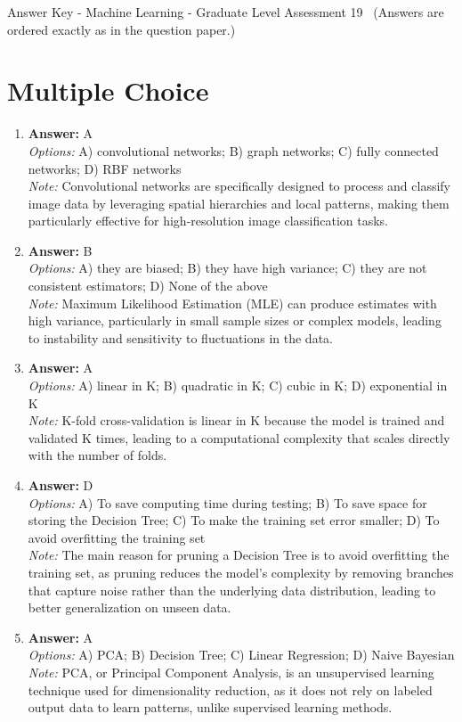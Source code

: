 \documentclass[12pt]{article}
\begin{document}
\begin{center}
Answer Key - Machine Learning - Graduate Level Assessment 19 \
\small (Answers are ordered exactly as in the question paper.)
\end{center}

\section*{Multiple Choice}
\begin{enumerate}[label=\arabic*.]
\item \textbf{Answer:} A
\\ \textit{Options:} A) convolutional networks; B) graph networks; C) fully connected networks; D) RBF networks
\\ \textit{Note:} Convolutional networks are specifically designed to process and classify image data by leveraging spatial hierarchies and local patterns, making them particularly effective for high-resolution image classification tasks.
\item \textbf{Answer:} B
\\ \textit{Options:} A) they are biased; B) they have high variance; C) they are not consistent estimators; D) None of the above
\\ \textit{Note:} Maximum Likelihood Estimation (MLE) can produce estimates with high variance, particularly in small sample sizes or complex models, leading to instability and sensitivity to fluctuations in the data.
\item \textbf{Answer:} A
\\ \textit{Options:} A) linear in K; B) quadratic in K; C) cubic in K; D) exponential in K
\\ \textit{Note:} K-fold cross-validation is linear in K because the model is trained and validated K times, leading to a computational complexity that scales directly with the number of folds.
\item \textbf{Answer:} D
\\ \textit{Options:} A) To save computing time during testing; B) To save space for storing the Decision Tree; C) To make the training set error smaller; D) To avoid overfitting the training set
\\ \textit{Note:} The main reason for pruning a Decision Tree is to avoid overfitting the training set, as pruning reduces the model's complexity by removing branches that capture noise rather than the underlying data distribution, leading to better generalization on unseen data.
\item \textbf{Answer:} A
\\ \textit{Options:} A) PCA; B) Decision Tree; C) Linear Regression; D) Naive Bayesian
\\ \textit{Note:} PCA, or Principal Component Analysis, is an unsupervised learning technique used for dimensionality reduction, as it does not rely on labeled output data to learn patterns, unlike supervised learning methods.
\end{enumerate}
\end{document}
